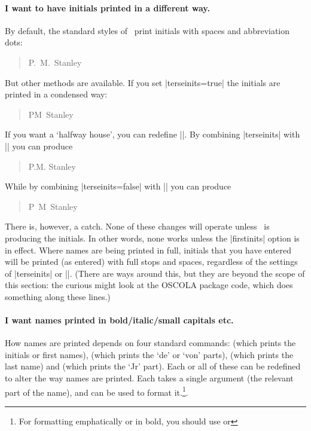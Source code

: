 \paragraph{I want to have initials printed in a different way.} By
default, the standard styles of \biblatex\ print initials with spaces
and abbreviation dots:
\begin{quote}
  P.~M.~Stanley
\end{quote}
But other methods are available. If you set |terseinits=true| the initials are printed in a condensed way:
\begin{quote}
  PM~Stanley
\end{quote}
If you want a `halfway house', you can redefine |\bibinitperiod|. By combining |terseinits| with |\renewcommand{\bibinitperiod}{\adddot}| you can produce
\begin{quote}
  P.M. Stanley
\end{quote}
While by combining |terseinits=false| with |\renewcommand{\bibinitperiod}{}| you can produce
\begin{quote}
  P~M~Stanley
\end{quote}

There is, however, a catch. None of these changes will operate unless
\biblatex\ is producing the initials. In other words, none works
unless the |firstinits| option is in effect. Where names are being
printed in full, initials that you have entered will be printed (as
entered) with full stops and spaces, regardless of the settings of
|terseinits| or |\bibinitperiod|. (There are ways around this, but
they are beyond the scope of this section: the curious might look at
the OSCOLA package code, which does something along these lines.)

\paragraph{I want names printed in bold/italic/small capitals etc.}
How names are printed depends on four standard commands:
 (which prints the initials or first names),
 (which prints the `de' or `von' parts),
 (which prints the last name) and
 (which prints the `Jr' part). Each or all of these
can be redefined to alter the way names are printed. Each takes a
single argument (the relevant part of the name), and can be used to
format it.\footnote{For formatting emphatically or in bold, you should
  use  or }.

